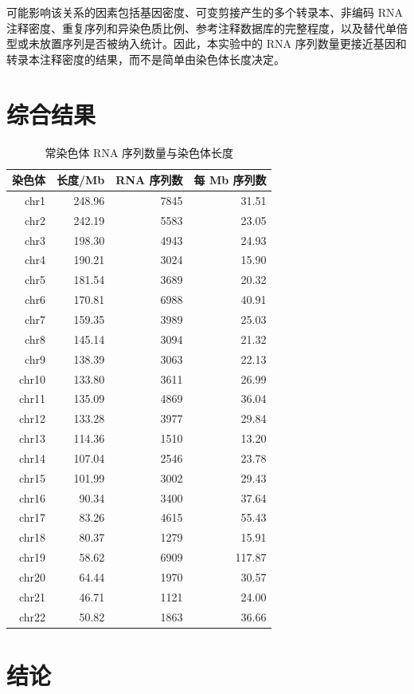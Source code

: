 \documentclass[12pt,a4paper,fontset=fandol]{ctexart}
\begin{document}
可能影响该关系的因素包括基因密度、可变剪接产生的多个转录本、非编码 RNA 注释密度、重复序列和异染色质比例、参考注释数据库的完整程度，以及替代单倍型或未放置序列是否被纳入统计。因此，本实验中的 RNA 序列数量更接近基因和转录本注释密度的结果，而不是简单由染色体长度决定。

\section{综合结果}

\begin{table}[H]
\centering
\caption{常染色体 RNA 序列数量与染色体长度}
\small
\begin{tabular}{rrrr}
\toprule
染色体 & 长度/Mb & RNA 序列数 & 每 Mb 序列数 \\
\midrule
chr1 & 248.96 & 7845 & 31.51 \\
chr2 & 242.19 & 5583 & 23.05 \\
chr3 & 198.30 & 4943 & 24.93 \\
chr4 & 190.21 & 3024 & 15.90 \\
chr5 & 181.54 & 3689 & 20.32 \\
chr6 & 170.81 & 6988 & 40.91 \\
chr7 & 159.35 & 3989 & 25.03 \\
chr8 & 145.14 & 3094 & 21.32 \\
chr9 & 138.39 & 3063 & 22.13 \\
chr10 & 133.80 & 3611 & 26.99 \\
chr11 & 135.09 & 4869 & 36.04 \\
chr12 & 133.28 & 3977 & 29.84 \\
chr13 & 114.36 & 1510 & 13.20 \\
chr14 & 107.04 & 2546 & 23.78 \\
chr15 & 101.99 & 3002 & 29.43 \\
chr16 & 90.34 & 3400 & 37.64 \\
chr17 & 83.26 & 4615 & 55.43 \\
chr18 & 80.37 & 1279 & 15.91 \\
chr19 & 58.62 & 6909 & 117.87 \\
chr20 & 64.44 & 1970 & 30.57 \\
chr21 & 46.71 & 1121 & 24.00 \\
chr22 & 50.82 & 1863 & 36.66 \\
\bottomrule
\end{tabular}
\end{table}

\section{结论}
\end{document}
